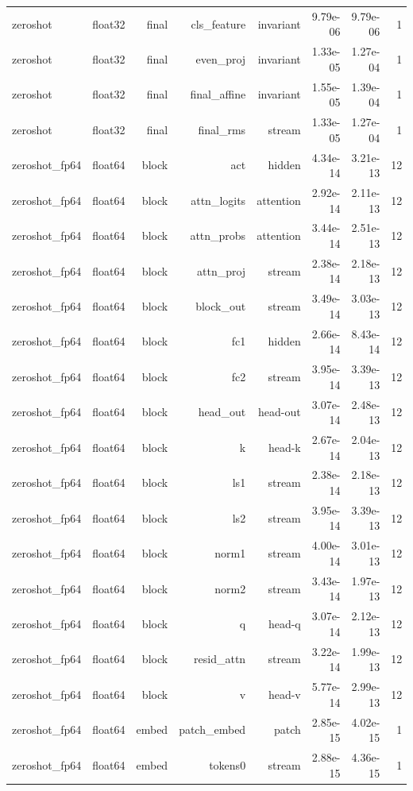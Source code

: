 \begin{table}[t]
\begin{tabular}{lrrrrrrr}
zeroshot & float32 & final & cls\_feature & invariant & 9.79e-06 & 9.79e-06 & 1 \\
zeroshot & float32 & final & even\_proj & invariant & 1.33e-05 & 1.27e-04 & 1 \\
zeroshot & float32 & final & final\_affine & invariant & 1.55e-05 & 1.39e-04 & 1 \\
zeroshot & float32 & final & final\_rms & stream & 1.33e-05 & 1.27e-04 & 1 \\
zeroshot\_fp64 & float64 & block & act & hidden & 4.34e-14 & 3.21e-13 & 12 \\
zeroshot\_fp64 & float64 & block & attn\_logits & attention & 2.92e-14 & 2.11e-13 & 12 \\
zeroshot\_fp64 & float64 & block & attn\_probs & attention & 3.44e-14 & 2.51e-13 & 12 \\
zeroshot\_fp64 & float64 & block & attn\_proj & stream & 2.38e-14 & 2.18e-13 & 12 \\
zeroshot\_fp64 & float64 & block & block\_out & stream & 3.49e-14 & 3.03e-13 & 12 \\
zeroshot\_fp64 & float64 & block & fc1 & hidden & 2.66e-14 & 8.43e-14 & 12 \\
zeroshot\_fp64 & float64 & block & fc2 & stream & 3.95e-14 & 3.39e-13 & 12 \\
zeroshot\_fp64 & float64 & block & head\_out & head-out & 3.07e-14 & 2.48e-13 & 12 \\
zeroshot\_fp64 & float64 & block & k & head-k & 2.67e-14 & 2.04e-13 & 12 \\
zeroshot\_fp64 & float64 & block & ls1 & stream & 2.38e-14 & 2.18e-13 & 12 \\
zeroshot\_fp64 & float64 & block & ls2 & stream & 3.95e-14 & 3.39e-13 & 12 \\
zeroshot\_fp64 & float64 & block & norm1 & stream & 4.00e-14 & 3.01e-13 & 12 \\
zeroshot\_fp64 & float64 & block & norm2 & stream & 3.43e-14 & 1.97e-13 & 12 \\
zeroshot\_fp64 & float64 & block & q & head-q & 3.07e-14 & 2.12e-13 & 12 \\
zeroshot\_fp64 & float64 & block & resid\_attn & stream & 3.22e-14 & 1.99e-13 & 12 \\
zeroshot\_fp64 & float64 & block & v & head-v & 5.77e-14 & 2.99e-13 & 12 \\
zeroshot\_fp64 & float64 & embed & patch\_embed & patch & 2.85e-15 & 4.02e-15 & 1 \\
zeroshot\_fp64 & float64 & embed & tokens0 & stream & 2.88e-15 & 4.36e-15 & 1 \\

\end{tabular}
\end{table}
